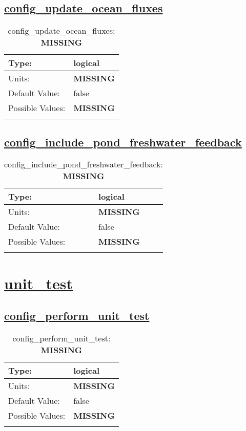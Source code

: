 \subsection[config\_update\_ocean\_fluxes]{\hyperref[sec:nm_tab_forcing]{config\_update\_ocean\_fluxes}}
\label{subsec:nm_sec_config_update_ocean_fluxes}
\begin{center}
\begin{longtable}{| p{2.0in} || p{4.0in} |}
    \hline
    Type: & logical \\
    \hline
    Units: & {\bf \color{red} MISSING} \\
    \hline
    Default Value: & false \\
    \hline
    Possible Values: & {\bf \color{red} MISSING} \\
    \hline
    \caption{config\_update\_ocean\_fluxes: {\bf \color{red} MISSING}}
\end{longtable}
\end{center}
\subsection[config\_include\_pond\_freshwater\_feedback]{\hyperref[sec:nm_tab_forcing]{config\_include\_pond\_freshwater\_feedback}}
\label{subsec:nm_sec_config_include_pond_freshwater_feedback}
\begin{center}
\begin{longtable}{| p{2.0in} || p{4.0in} |}
    \hline
    Type: & logical \\
    \hline
    Units: & {\bf \color{red} MISSING} \\
    \hline
    Default Value: & false \\
    \hline
    Possible Values: & {\bf \color{red} MISSING} \\
    \hline
    \caption{config\_include\_pond\_freshwater\_feedback: {\bf \color{red} MISSING}}
\end{longtable}
\end{center}
\section[unit\_test]{\hyperref[sec:nm_tab_unit_test]{unit\_test}}
\label{sec:nm_sec_unit_test}
\subsection[config\_perform\_unit\_test]{\hyperref[sec:nm_tab_unit_test]{config\_perform\_unit\_test}}
\label{subsec:nm_sec_config_perform_unit_test}
\begin{center}
\begin{longtable}{| p{2.0in} || p{4.0in} |}
    \hline
    Type: & logical \\
    \hline
    Units: & {\bf \color{red} MISSING} \\
    \hline
    Default Value: & false \\
    \hline
    Possible Values: & {\bf \color{red} MISSING} \\
    \hline
    \caption{config\_perform\_unit\_test: {\bf \color{red} MISSING}}
\end{longtable}
\end{center}

